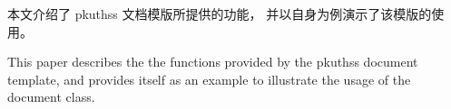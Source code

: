 %

\begin{cabstract}
	本文介绍了 pkuthss 文档模版所提供的功能，
	并以自身为例演示了该模版的使用。
\end{cabstract}

\begin{eabstract}
	This paper describes the the functions provided by
	the pkuthss document template,
	and provides itself as an example to illustrate
	the usage of the document class.
\end{eabstract}

